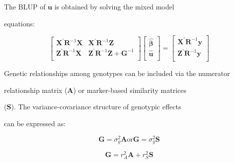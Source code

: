 \documentclass[10pt,twoside]{article}
\numberwithin{equation}{section}
\begin{document}
The BLUP of \(\mathbf{u}\) is obtained by solving the mixed model

equations:



\[\begin{bmatrix}

\mathbf{X}^{'}\mathbf{R}^{- 1}\mathbf{X} & \mathbf{X}^{'}\mathbf{R}^{- 1}\mathbf{Z} \\

\mathbf{Z}^{'}\mathbf{R}^{- 1}\mathbf{X} & \mathbf{Z}^{'}\mathbf{R}^{- 1}\mathbf{Z} + \mathbf{G}^{- 1} \\

\end{bmatrix}\begin{bmatrix}

\widehat{\mathbf{\beta}} \\

\widehat{\mathbf{u}} \\

\end{bmatrix} = \begin{bmatrix}

\mathbf{X}^{'}\mathbf{R}^{- 1}\mathbf{y} \\

\mathbf{Z}^{'}\mathbf{R}^{- 1}\mathbf{y} \\

\end{bmatrix}

\]



Genetic relationships among genotypes can be included via the numerator

relationship matrix (\(\mathbf{A}\)) or marker-based similarity matrices

(\(\mathbf{S}\)). The variance-covariance structure of genotypic effects

can be expressed as:



\[\mathbf{G} = \sigma_{g}^{2}\mathbf{A}\text{or}\mathbf{G} = \sigma_{g}^{2}\mathbf{S}\mathbf{

}\]



\[\mathbf{G} = r_{A}^{2}\mathbf{A} + r_{S}^{2}\mathbf{S}\mathbf{

}\]
\end{document}
